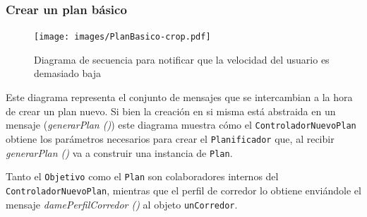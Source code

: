 \newpage

\subsubsection{Crear un plan básico}
\begin{figure}[h]
	\texttt{[image: images/PlanBasico-crop.pdf]}
	\caption{Diagrama de secuencia para notificar que la velocidad del usuario es demasiado baja}
\end{figure} 

Este diagrama representa el conjunto de mensajes que se intercambian a la hora de crear un plan nuevo. Si bien la creación en si misma está abstraida en un mensaje (\emph{generarPlan ()}) este diagrama muestra cómo el \texttt{ControladorNuevoPlan} obtiene los parámetros necesarios para crear el \texttt{Planificador} que, al recibir \emph{generarPlan ()} va a construir una instancia de \texttt{Plan}. 

Tanto el \texttt{Objetivo} como el \texttt{Plan} son colaboradores internos del \texttt{ControladorNuevoPlan}, mientras que el perfil de corredor lo obtiene enviándole el mensaje \emph{damePerfilCorredor ()} al objeto \texttt{unCorredor}.